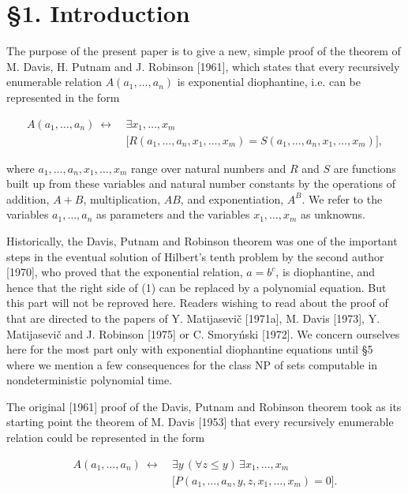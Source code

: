 \documentclass[11pt,leqno]{article}
\newcommand{\origpage}[1]{\marginnote{\footnotesize\textbf{[#1]}}}
\begin{document}
\section*{\S1. Introduction} \origpage{818}The purpose of the present paper is to give a new, simple proof of the theorem of M. Davis, H. Putnam and J. Robinson [1961], which states that every recursively enumerable relation $A\left(a_{1}, \ldots, a_{n}\right)$ is exponential diophantine, i.e. can be represented in the form

\begin{equation*}
\begin{aligned}
A(a_1,\ldots,a_n)\ \longleftrightarrow\ {}&\exists x_1,\ldots,x_m\\
&\bigl[R(a_1,\ldots,a_n,x_1,\ldots,x_m)
=S(a_1,\ldots,a_n,x_1,\ldots,x_m)\bigr],
\end{aligned} \tag{1}\label{eq:1}
\end{equation*}

where $a_{1}, \ldots, a_{n}, x_{1}, \ldots, x_{m}$ range over natural numbers and $R$ and $S$ are functions built up from these variables and natural number constants by the operations of addition, $A+B$, multiplication, $A B$, and exponentiation, $A^{B}$. We refer to the variables $a_{1}, \ldots, a_{n}$ as parameters and the variables $x_{1}, \ldots, x_{m}$ as unknowns.

Historically, the Davis, Putnam and Robinson theorem was one of the important steps in the eventual solution of Hilbert's tenth problem by the second author [1970], who proved that the exponential relation, $a=b^{c}$, is diophantine, and hence that the right side of (1) can be replaced by a polynomial equation. But this part will not be reproved here. Readers wishing to read about the proof of that are directed to the papers of Y. Matijasevi\v{c} [1971a], M. Davis [1973], Y. Matijasevi\v{c} and J. Robinson [1975] or C. Smory\'{n}ski [1972]. We concern ourselves here for the most part only with exponential diophantine equations until \S5 where we mention a few consequences for the class $\mathrm{NP}$ of sets computable in nondeterministic polynomial time.

The original [1961] proof of the Davis, Putnam and Robinson theorem took as its starting point the theorem of M. Davis [1953] that every recursively enumerable \origpage{819}relation could be represented in the form

\begin{equation*}
\begin{aligned}
A(a_1,\ldots,a_n)\ \longleftrightarrow\ {}&\exists y\,(\forall z\leq y)\,\exists x_1,\ldots,x_m\\
&\bigl[P(a_1,\ldots,a_n,y,z,x_1,\ldots,x_m)=0\bigr].
\end{aligned} \tag{2}\label{eq:2}
\end{equation*}
\end{document}
